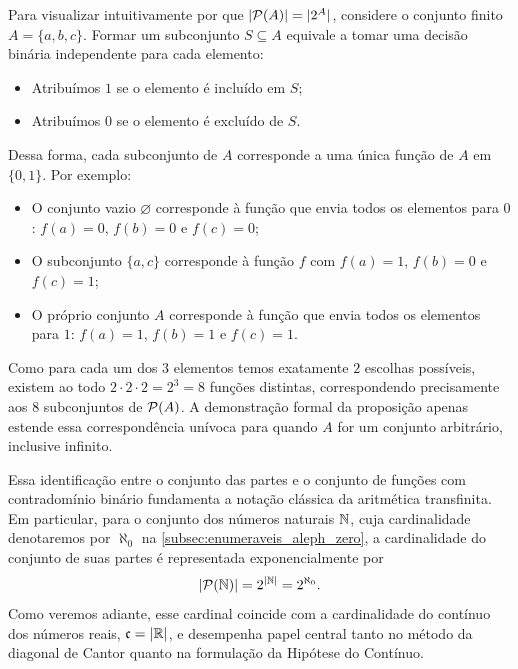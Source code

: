 \begin{exemplo}
    \label{ex:partes_funcoes_binarias}
    Para visualizar intuitivamente por que \(|\mathcal{P}(A)| = |2^A|\), considere o conjunto finito \(A = \{a, b, c\}\). Formar um subconjunto \(S \subseteq A\) equivale a tomar uma decisão binária independente para cada elemento:
    \begin{itemize}
        \item Atribuímos \(1\) se o elemento é incluído em \(S\);
        \item Atribuímos \(0\) se o elemento é excluído de \(S\).
    \end{itemize}
    Dessa forma, cada subconjunto de \(A\) corresponde a uma única função de \(A\) em \(\{0, 1\}\). Por exemplo:
    \begin{itemize}
        \item O conjunto vazio \(\varnothing\) corresponde à função que envia todos os elementos para \(0\): \(f(a) = 0\), \(f(b) = 0\) e \(f(c) = 0\);
        \item O subconjunto \(\{a, c\}\) corresponde à função \(f\) com \(f(a) = 1\), \(f(b) = 0\) e \(f(c) = 1\);
        \item O próprio conjunto \(A\) corresponde à função que envia todos os elementos para \(1\): \(f(a) = 1\), \(f(b) = 1\) e \(f(c) = 1\).
    \end{itemize}
    Como para cada um dos \(3\) elementos temos exatamente \(2\) escolhas possíveis, existem ao todo \(2 \cdot 2 \cdot 2 = 2^3 = 8\) funções distintas, correspondendo precisamente aos \(8\) subconjuntos de \(\mathcal{P}(A)\). A demonstração formal da proposição apenas estende essa correspondência unívoca para quando \(A\) for um conjunto arbitrário, inclusive infinito.
\end{exemplo}

Essa identificação entre o conjunto das partes e o conjunto de funções com contradomínio binário fundamenta a notação clássica da aritmética transfinita. Em particular, para o conjunto dos números naturais \(\mathbb{N}\), cuja cardinalidade denotaremos por \(\aleph_0\) na \autoref{subsec:enumeraveis_aleph_zero}, a cardinalidade do conjunto de suas partes é representada exponencialmente por
\[
    |\mathcal{P}(\mathbb{N})| = 2^{|\mathbb{N}|} = 2^{\aleph_0}.
\]
Como veremos adiante, esse cardinal coincide com a cardinalidade do contínuo dos números reais, \(\mathfrak{c} = |\mathbb{R}|\), e desempenha papel central tanto no método da diagonal de Cantor quanto na formulação da Hipótese do Contínuo.

